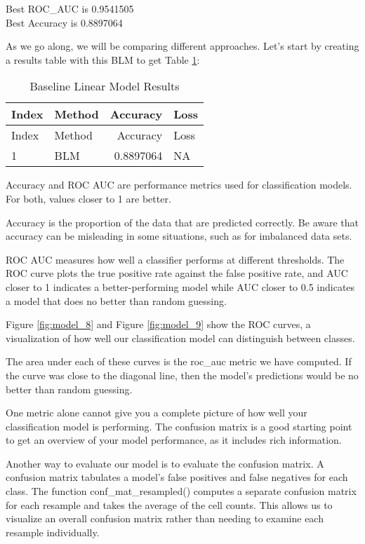 \documentclass[
]{article}
\begin{document}
Best ROC\_AUC is 0.9541505\\
Best Accuracy is 0.8897064

As we go along, we will be comparing different approaches. Let's start
by creating a results table with this BLM to get Table
\ref{tbl:blm_results_table}:

\begin{longtable}[]{@{}llrl@{}}
\caption{Baseline Linear Model
Results\label{tbl:blm_results_table}}\tabularnewline
\toprule
Index & Method & Accuracy & Loss \\
\midrule
\endfirsthead
\toprule
Index & Method & Accuracy & Loss \\
\midrule
\endhead
1 & BLM & 0.8897064 & NA \\
\bottomrule
\end{longtable}

Accuracy and ROC AUC are performance metrics used for classification
models. For both, values closer to 1 are better.

Accuracy is the proportion of the data that are predicted correctly. Be
aware that accuracy can be misleading in some situations, such as for
imbalanced data sets.

ROC AUC measures how well a classifier performs at different thresholds.
The ROC curve plots the true positive rate against the false positive
rate, and AUC closer to 1 indicates a better-performing model while AUC
closer to 0.5 indicates a model that does no better than random
guessing.

Figure \ref{fig:model_8} and Figure \ref{fig:model_9} show the ROC
curves, a visualization of how well our classification model can
distinguish between classes.

The area under each of these curves is the roc\_auc metric we have
computed. If the curve was close to the diagonal line, then the model's
predictions would be no better than random guessing.

One metric alone cannot give you a complete picture of how well your
classification model is performing. The confusion matrix is a good
starting point to get an overview of your model performance, as it
includes rich information.

Another way to evaluate our model is to evaluate the confusion matrix. A
confusion matrix tabulates a model's false positives and false negatives
for each class. The function conf\_mat\_resampled() computes a separate
confusion matrix for each resample and takes the average of the cell
counts. This allows us to visualize an overall confusion matrix rather
than needing to examine each resample individually.
\end{document}
